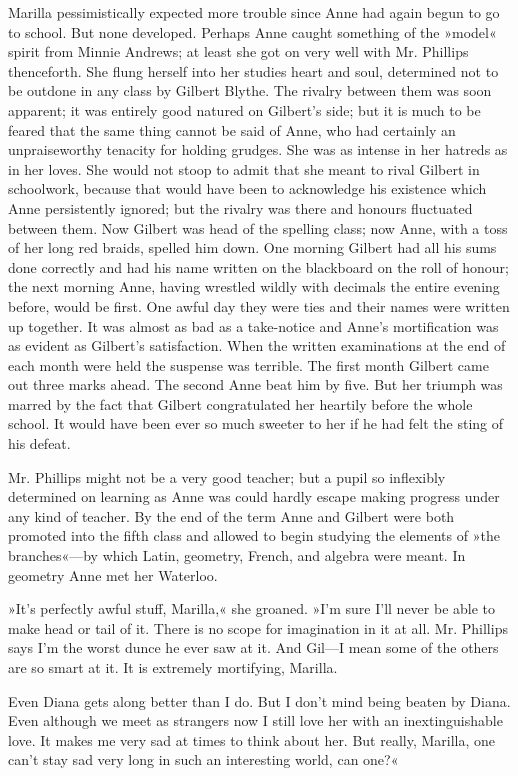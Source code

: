 Marilla pessimistically expected more trouble since Anne had again begun to go to school. But none developed. Perhaps Anne caught something of the »model« spirit from Minnie Andrews; at least she got on very well with Mr. Phillips thenceforth. She flung herself into her studies heart and soul, determined not to be outdone in any class by Gilbert Blythe. The rivalry between them was soon apparent; it was entirely good natured on Gilbert's side; but it is much to be feared that the same thing cannot be said of Anne, who had certainly an unpraiseworthy tenacity for holding grudges. She was as intense in her hatreds as in her loves. She would not stoop to admit that she meant to rival Gilbert in schoolwork, because that would have been to acknowledge his existence which Anne persistently ignored; but the rivalry was there and honours fluctuated between them. Now Gilbert was head of the spelling class; now Anne, with a toss of her long red braids, spelled him down. One morning Gilbert had all his sums done correctly and had his name written on the blackboard on the roll of honour; the next morning Anne, having wrestled wildly with decimals the entire evening before, would be first. One awful day they were ties and their names were written up together. It was almost as bad as a take-notice and Anne's mortification was as evident as Gilbert's satisfaction. When the written examinations at the end of each month were held the suspense was terrible. The first month Gilbert came out three marks ahead. The second Anne beat him by five. But her triumph was marred by the fact that Gilbert congratulated her heartily before the whole school. It would have been ever so much sweeter to her if he had felt the sting of his defeat.

Mr. Phillips might not be a very good teacher; but a pupil so inflexibly determined on learning as Anne was could hardly escape making progress under any kind of teacher. By the end of the term Anne and Gilbert were both promoted into the fifth class and allowed to begin studying the elements of »the branches«—by which Latin, geometry, French, and algebra were meant. In geometry Anne met her Waterloo.

»It's perfectly awful stuff, Marilla,« she groaned. »I'm sure I'll never be able to make head or tail of it. There is no scope for imagination in it at all. Mr. Phillips says I'm the worst dunce he ever saw at it. And Gil—I mean some of the others are so smart at it. It is extremely mortifying, Marilla.

Even Diana gets along better than I do. But I don't mind being beaten by Diana. Even although we meet as strangers now I still love her with an inextinguishable love. It makes me very sad at times to think about her. But really, Marilla, one can't stay sad very long in such an interesting world, can one?«